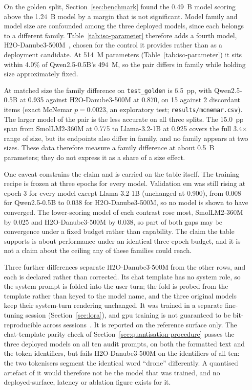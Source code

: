 On the golden split, Section~\ref{sec:benchmark} found the 0.49~B model scoring above the 1.24~B
model by a margin that is not significant. Model family and model size are confounded among the
three deployed models, since each belongs to a different family. Table~\ref{tab:iso-parameter}
therefore adds a fourth model, H2O-Danube3-500M~\cite{danube3}, chosen for the control it provides
rather than as a deployment candidate. At 514~M parameters (Table~\ref{tab:iso-parameter}) it sits
within 4.0\% of Qwen2.5-0.5B's 494~M, so the pair differs in family while holding size
approximately fixed.



At matched size the family difference on \texttt{test\_golden} is 6.5~pp, with Qwen2.5-0.5B at
0.935 against H2O-Danube3-500M at 0.870, on 15 against 2 discordant items (exact McNemar
$p = 0.0023$, an exploratory test; \texttt{results/mcnemar.csv}). The larger model of the pair is
the less accurate on all three splits. The 15.0~pp span from SmolLM2-360M at 0.775 to Llama-3.2-1B
at 0.925 covers the full 3.4$\times$ range of size, but its endpoints also differ in family, and no
family appears at two sizes. These data therefore measure a family difference at about 0.5~B
parameters; they do not express it as a share of a size effect.

One caveat constrains the claim and is carried on the table itself. The training recipe is frozen
at three epochs for every model. Validation \gls{em} was still rising at epoch 3 for every model
except Llama-3.2-1B (unchanged at 0.900), from 0.008 for Qwen2.5-0.5B to 0.038 for
H2O-Danube3-500M, so no model is shown to have converged. The lower-scoring model of each contrast
rose most, SmolLM2-360M by 0.025 and H2O-Danube3-500M by 0.038, so part of both gaps may be
convergence under a fixed budget rather than capability. The claim the table supports is about
performance under an identical three-epoch budget, and it is not a claim about the ceiling any of
these families could reach.

Three further differences separate H2O-Danube3-500M from the other rows, and each is declared
rather than corrected. Its chat template has no system role, so the system prompt is folded into
the user turn; the fold is probed from the template rather than keyed to the model name, and the
three original models keep their system-turn rendering unchanged. It was trained in a separate
fine-tuning session (Section~\ref{sec:lora}), and \gls{gpu} training is not guaranteed to be
bit-reproducible across sessions~\cite{pytorchrepro}. It is reported on the reference surface only.
The chat-template parity check of Section~\ref{sec:quantisation-procedure} passes the three
deployed models on all ten audit prompts, on both the formatted text and the token identifiers, but
fails H2O-Danube3-500M on the identifiers of all ten: the two tokenisers segment the identical word
``drone'' differently. A quantised artefact of it would therefore not be the model that was
trained, and no deployed-surface, latency or ablation figure exists for it.

